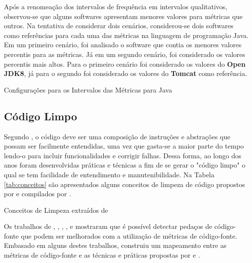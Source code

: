 \FloatBarrier

Após a renomeação dos intervalos de frequência em intervalos qualitativos, observou-se que alguns softwares apresentam menores valores para métricas que outros. Na tentativa de considerar dois cenários, considerou-se dois softwares como referências para cada uma das métricas na linguagem de programação Java. Em um primeiro cenário, foi analisado o software que contia os menores valores percentis para as métricas. Já em um segundo cenário, foi considerado os valores percentis mais altos. Para o primeiro cenário foi considerado os valores do \textbf{Open JDK8}, já para o segundo foi considerado os valores do \textbf{Tomcat} como referência.


	
	\begin{table}[!ht]
	\begin{center}
		
	\caption{Configurações para os Intervalos das Métricas para Java}
	\label{tab:good-metrics}
	\end{center}
	\end{table}
	\FloatBarrier

\subsection{Código Limpo} 
\label{sec:clean-code}

Segundo , o código deve ser uma composição de instruções e abstrações que possam ser facilmente entendidas, uma vez que gasta-se a maior parte do tempo lendo-o para incluir funcionalidades e corrigir falhas. Dessa forma, ao longo dos anos foram desenvolvidas práticas e técnicas a fim de se gerar o "código limpo" o qual se tem facilidade de entendimento e manutenibilidade. Na Tabela \ref{tab:conceitos} são apresentados alguns conceitos de limpeza de código propostos por  e  compilados por .



\begin{table}[!ht]
\centering

\caption{Conceitos de Limpeza extraídos de }
\label{tab:conceitos}
\end{table}
\FloatBarrier

Os trabalhos de , , , ,  e  mostraram que é possível detectar pedaços de código-fonte que podem ser melhorados com a utilização de métricas de código-fonte. Embasado em alguns destes trabalhos,  construiu um mapeamento entre as métricas de código-fonte e as técnicas e práticas propostas por  e . 


